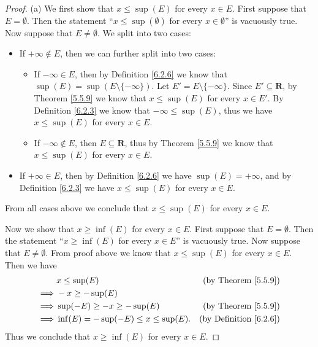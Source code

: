 \begin{proof}{(a)}
      We first show that \(x \leq \sup(E)\) for every \(x \in E\).
      First suppose that \(E = \emptyset\).
      Then the statement ``\(x \leq \sup(\emptyset)\) for every \(x \in \emptyset\)'' is vacuously true.
      Now suppose that \(E \neq \emptyset\).
      We split into two cases:
      \begin{itemize}
            \item If \(+\infty \not\in E\), then we can further split into two cases:
                  \begin{itemize}
                        \item If \(-\infty \in E\), then by Definition \ref{6.2.6} we know that \(\sup(E) = \sup(E \setminus \{-\infty\})\).
                              Let \(E' = E \setminus \{-\infty\}\).
                              Since \(E' \subseteq \mathbf{R}\), by Theorem \ref{5.5.9} we know that \(x \leq \sup(E)\) for every \(x \in E'\).
                              By Definition \ref{6.2.3} we know that \(-\infty \leq \sup(E)\), thus we have \(x \leq \sup(E)\) for every \(x \in E\).
                        \item If \(-\infty \notin E\), then \(E \subseteq \mathbf{R}\), thus by Theorem \ref{5.5.9} we know that \(x \leq \sup(E)\) for every \(x \in E\).
                  \end{itemize}
            \item If \(+\infty \in E\), then by Definition \ref{6.2.6} we have \(\sup(E) = +\infty\), and by Definition \ref{6.2.3} we have \(x \leq \sup(E)\) for every \(x \in E\).
      \end{itemize}
      From all cases above we conclude that \(x \leq \sup(E)\) for every \(x \in E\).

      Now we show that \(x \geq \inf(E)\) for every \(x \in E\).
      First suppose that \(E = \emptyset\).
      Then the statement ``\(x \geq \inf(E)\) for every \(x \in E\)'' is vacuously true.
      Now suppose that \(E \neq \emptyset\).
      From proof above we know that \(x \leq \sup(E)\) for every \(x \in E\).
      Then we have
      \begin{align*}
                     & x \leq \sup(E)                           & \text{(by Theorem \ref{5.5.9})}    \\
            \implies & -x \geq -\sup(E)                                                              \\
            \implies & \sup(-E) \geq -x \geq -\sup(E)           & \text{(by Theorem \ref{5.5.9})}    \\
            \implies & \inf(E) = -\sup(-E) \leq x \leq \sup(E). & \text{(by Definition \ref{6.2.6})}
      \end{align*}
      Thus we conclude that \(x \geq \inf(E)\) for every \(x \in E\).
\end{proof}

